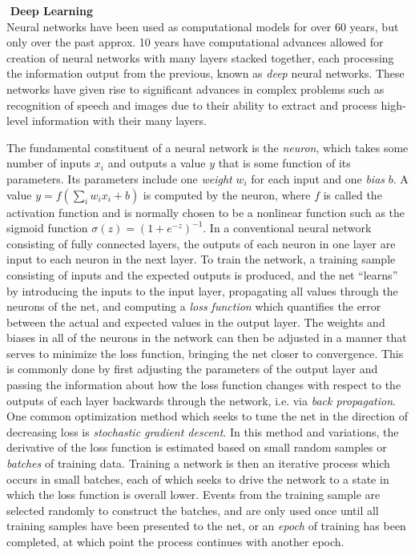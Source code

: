 \documentclass[11pt,a4paper]{article}
\begin{document}
\noindent\textbf{\textbullet\,\,Deep Learning}\\
Neural networks have been used as computational models for over 60 years, but only over the past approx. 10 years have computational advances allowed for creation of neural networks with many layers stacked together, each processing the information output from the previous, known as \emph{deep} neural networks. These networks have given rise to significant advances in complex problems such as recognition of speech \cite{Hinton_2012} and images \cite{Googlenet} due to their ability to extract and process high-level information with their many layers.

The fundamental constituent of a neural network is the \emph{neuron}, which takes some number of inputs $x_i$ and outputs a value $y$ that is some function of its parameters. Its parameters include one \emph{weight} $w_i$ for each input and one \emph{bias} $b$. A value $y = f(\sum_{i}w_{i}x_{i} + b)$ is computed by the neuron, where $f$ is called the activation function and is normally chosen to be a nonlinear function such as the sigmoid function $\sigma(z) = (1 + e^{-z})^{-1}$. In a conventional neural network consisting of fully connected layers, the outputs of each neuron in one layer are input to each neuron in the next layer. To train the network, a training sample consisting of inputs and the expected outputs is produced, and the net ``learns'' by introducing the inputs to the input layer, propagating all values through the neurons of the net, and computing a \emph{loss function} which quantifies the error between the actual and expected values in the output layer. The weights and biases in all of the neurons in the network can then be adjusted in a manner that serves to minimize the loss function, bringing the net closer to convergence. This is commonly done by first adjusting the parameters of the output layer and passing the information about how the loss function changes with respect to the outputs of each layer backwards through the network, i.e. via \emph{back propagation}. One common optimization method which seeks to tune the net in the direction of decreasing loss is \emph{stochastic gradient descent}. In this method and variations, the derivative of the loss function is estimated based on small random samples or \emph{batches} of training data. Training a network is then an iterative process which occurs in small batches, each of which seeks to drive the network to a state in which the loss function is overall lower. Events from the training sample are selected randomly to construct the batches, and are only used once until all training samples have been presented to the net, or an \emph{epoch} of training has been completed, at which point the process continues with another epoch.
\end{document}
